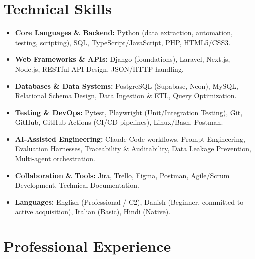 \documentclass[10pt,a4paper]{article}
\begin{document}
\section*{Technical Skills}
\small
\begin{itemize}
    \item \textbf{Core Languages \& Backend:} Python (data extraction, automation, testing, scripting), SQL, TypeScript/JavaScript, PHP, HTML5/CSS3.
    \item \textbf{Web Frameworks \& APIs:} Django (foundations), Laravel, Next.js, Node.js, RESTful API Design, JSON/HTTP handling.
    \item \textbf{Databases \& Data Systems:} PostgreSQL (Supabase, Neon), MySQL, Relational Schema Design, Data Ingestion \& ETL, Query Optimization.
    \item \textbf{Testing \& DevOps:} Pytest, Playwright (Unit/Integration Testing), Git, GitHub, GitHub Actions (CI/CD pipelines), Linux/Bash, Postman.
    \item \textbf{AI-Assisted Engineering:} Claude Code workflows, Prompt Engineering, Evaluation Harnesses, Traceability \& Auditability, Data Leakage Prevention, Multi-agent orchestration.
    \item \textbf{Collaboration \& Tools:} Jira, Trello, Figma, Postman, Agile/Scrum Development, Technical Documentation.
    \item \textbf{Languages:} English (Professional / C2), Danish (Beginner, committed to active acquisition), Italian (Basic), Hindi (Native).
\end{itemize}

\section*{Professional Experience}
\small
\end{document}
